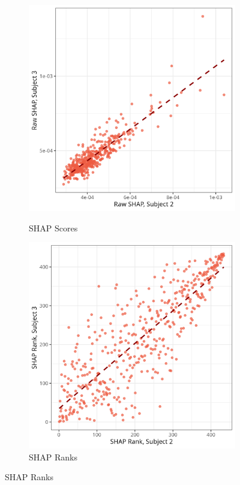\documentclass[10pt,letterpaper]{article}
\begin{document}
\begin{figure}[ht]
    \begin{subfigure}[t]{0.22\textwidth}
        \centering
        \caption{SHAP Scores}
        \includegraphics[width=\textwidth]{figs/scatter_laws_shap_raw.png}
        \label{subfig:scatter_laws_shap_raw}
    \end{subfigure}
    \hfill
    \begin{subfigure}[t]{0.22\textwidth}
        \centering
        \caption{SHAP Ranks}
        \includegraphics[width=\textwidth]{figs/scatter_laws_shap_rank.png}

\end{subfigure}
\end{figure}
\end{document}
